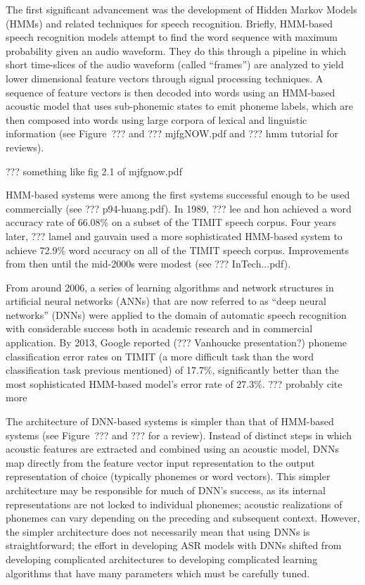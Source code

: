 The first significant advancement
was the development of
Hidden Markov Models (HMMs)
and related techniques
for speech recognition.
Briefly,
HMM-based speech recognition models
attempt to find the word sequence
with maximum probability given
an audio waveform.
They do this through
a pipeline in which
short time-slices of the audio waveform
(called ``frames'')
are analyzed to yield lower dimensional
feature vectors
through signal processing techniques.
A sequence of feature vectors
is then decoded into words
using an HMM-based acoustic model
that uses sub-phonemic states
to emit phoneme labels,
which are then composed into words
using large corpora of
lexical and linguistic information
(see Figure~??? and ??? mjfgNOW.pdf
and ??? hmm tutorial for reviews).

??? something like fig 2.1 of mjfgnow.pdf

HMM-based systems
were among the first systems
successful enough to be
used commercially
(see ??? p94-huang.pdf).
In 1989, ??? lee and hon
achieved a word accuracy rate of
66.08\% on a subset of the
TIMIT speech corpus.
Four years later,
??? lamel and gauvain
used a more sophisticated HMM-based system
to achieve 72.9\% word accuracy on
all of the TIMIT speech corpus.
Improvements from then until
the mid-2000s were modest
(see ??? InTech...pdf).

From around 2006, a series of learning algorithms
and network structures in artificial neural networks (ANNs)
that are now referred to as ``deep neural networks'' (DNNs)
were applied to
the domain of automatic speech recognition
with considerable success
both in academic research
and in commercial application.
By 2013, Google reported
(??? Vanhoucke presentation?)
phoneme classification error rates on TIMIT
(a more difficult task than
the word classification task previous mentioned)
of 17.7\%,
significantly better than the most sophisticated
HMM-based model's error rate of 27.3\%.
??? probably cite more

The architecture of DNN-based systems
is simpler than that of HMM-based systems
(see Figure~??? and ??? for a review).
Instead of distinct steps in which
acoustic features are extracted
and combined using an acoustic model,
DNNs map directly from the
feature vector input representation
to the output representation of choice
(typically phonemes or word vectors).
This simpler architecture may be
responsible for much of DNN's success,
as its internal representations
are not locked to individual phonemes;
acoustic realizations
of phonemes can vary depending on
the preceding and subsequent context.
However, the simpler architecture
does not necessarily mean that
using DNNs is straightforward;
the effort in developing ASR models
with DNNs shifted from
developing complicated architectures
to developing complicated learning algorithms
that have many parameters
which must be carefully tuned.

